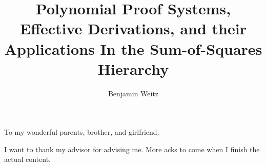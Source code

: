 \documentclass{ucbthesis}
\begin{document}

\title{Polynomial Proof Systems, Effective Derivations, and their Applications In the Sum-of-Squares Hierarchy}
\author{Benjamin Weitz}




\maketitle
\approvalpage
\copyrightpage



\begin{frontmatter}

\begin{dedication}
\null\vfil
\begin{center}
To my wonderful parents, brother, and girlfriend. 
\end{center}
\vfil\null
\end{dedication}

\tableofcontents
\clearpage

\begin{acknowledgements}
I want to thank my advisor for advising me. More acks to come when I finish the actual content. 
\end{acknowledgements}

\end{frontmatter}

\pagestyle{headings}










\printbibliography
\end{document}
